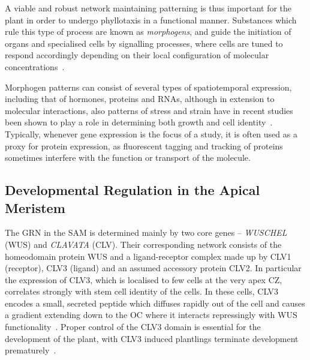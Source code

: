 A viable and robust network maintaining patterning is thus important for 
the plant in order to undergo phyllotaxis in a functional manner. Substances
which rule this type of  
process are known as \textit{morphogens}, and guide the initiation of organs and
specialised cells by signalling processes, where cells are tuned to respond
accordingly depending on their local configuration of molecular
concentrations~\cite{lawrence1996morphogens}.

Morphogen patterns can consist of several
types of spatiotemporal expression, including that of hormones, proteins and
RNAs, although in extension to molecular interactions, also patterns
of stress and strain have in recent studies been shown to play a role in
determining both growth and cell
identity~\cite{Bozorg2016,hamant2008developmental}. Typically, whenever gene expression is the focus of a study, it
is often used as a proxy for protein expression, as fluorescent tagging
and tracking of proteins sometimes interfere with the function or transport of
the molecule. 

\subsection{Developmental Regulation in the Apical Meristem} %
The GRN in the SAM is determined mainly by two core genes -- \textit{WUSCHEL} (WUS) and
\textit{CLAVATA} (CLV). Their corresponding network consists of the homeodomain
protein WUS and a ligand-receptor complex made up by CLV1 (receptor), CLV3 (ligand) and
an assumed accessory protein CLV2. In particular the expression of CLV3, which
is localised to few cells at the very apex CZ, correlates strongly with stem cell identity of
the cells. In these cells, CLV3 encodes a small, secreted peptide which diffuses
rapidly out of the cell and causes a gradient extending down to the OC where it
interacts repressingly with WUS functionality~\cite{clark2001cell}. Proper control of the CLV3 domain
is essential for the development of the plant, with CLV3 induced plantlings
terminate development prematurely~\cite{brand2002regulation}.

